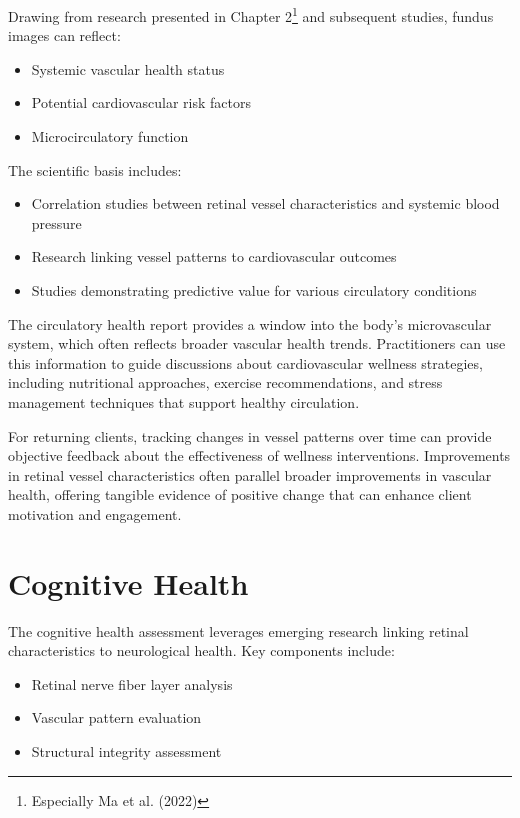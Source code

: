 \documentclass[
  Letterpaper,
]{scrbook}
\providecommand{\tightlist}{%
  \setlength{\itemsep}{0pt}\setlength{\parskip}{0pt}}\usepackage{longtable,booktabs,array}
\begin{document}
Drawing from research presented in Chapter 2\footnote{Especially Ma et
  al. (2022)} and subsequent studies, fundus images can reflect:

\begin{itemize}
\tightlist
\item
  Systemic vascular health status
\item
  Potential cardiovascular risk factors
\item
  Microcirculatory function
\end{itemize}

The scientific basis includes:

\begin{itemize}
\tightlist
\item
  Correlation studies between retinal vessel characteristics and
  systemic blood pressure
\item
  Research linking vessel patterns to cardiovascular outcomes
\item
  Studies demonstrating predictive value for various circulatory
  conditions
\end{itemize}

The circulatory health report provides a window into the body's
microvascular system, which often reflects broader vascular health
trends. Practitioners can use this information to guide discussions
about cardiovascular wellness strategies, including nutritional
approaches, exercise recommendations, and stress management techniques
that support healthy circulation.

For returning clients, tracking changes in vessel patterns over time can
provide objective feedback about the effectiveness of wellness
interventions. Improvements in retinal vessel characteristics often
parallel broader improvements in vascular health, offering tangible
evidence of positive change that can enhance client motivation and
engagement.

\section{Cognitive Health}\label{cognitive-health}

The cognitive health assessment leverages emerging research linking
retinal characteristics to neurological health. Key components include:

\begin{itemize}
\tightlist
\item
  Retinal nerve fiber layer analysis
\item
  Vascular pattern evaluation
\item
  Structural integrity assessment
\end{itemize}
\end{document}
